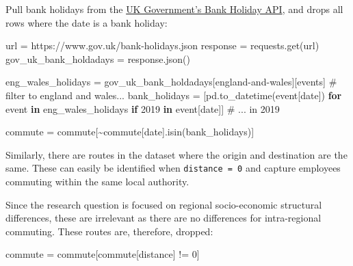 \documentclass[
  number]{elsarticle}
\newenvironment{Shaded}{\begin{snugshade}}{\end{snugshade}}
\newcommand{\CommentTok}[1]{\textcolor[rgb]{0.37,0.37,0.37}{#1}}
\newcommand{\ControlFlowTok}[1]{\textcolor[rgb]{0.00,0.23,0.31}{\textbf{#1}}}
\newcommand{\DecValTok}[1]{\textcolor[rgb]{0.68,0.00,0.00}{#1}}
\newcommand{\KeywordTok}[1]{\textcolor[rgb]{0.00,0.23,0.31}{\textbf{#1}}}
\newcommand{\NormalTok}[1]{\textcolor[rgb]{0.00,0.23,0.31}{#1}}
\newcommand{\OperatorTok}[1]{\textcolor[rgb]{0.37,0.37,0.37}{#1}}
\newcommand{\StringTok}[1]{\textcolor[rgb]{0.13,0.47,0.30}{#1}}
\begin{document}
Pull bank holidays from the
\href{https://www.gov.uk/bank-holidays.json}{UK Government's Bank
Holiday API}, and drops all rows where the date is a bank holiday:

\begin{Shaded}
\begin{Highlighting}[]
\NormalTok{url }\OperatorTok{=} \StringTok{\textquotesingle{}https://www.gov.uk/bank{-}holidays.json\textquotesingle{}}
\NormalTok{response }\OperatorTok{=}\NormalTok{ requests.get(url)}
\NormalTok{gov\_uk\_bank\_holdadays }\OperatorTok{=}\NormalTok{ response.json()}

\NormalTok{eng\_wales\_holidays }\OperatorTok{=}\NormalTok{ gov\_uk\_bank\_holdadays[}\StringTok{\textquotesingle{}england{-}and{-}wales\textquotesingle{}}\NormalTok{][}\StringTok{\textquotesingle{}events\textquotesingle{}}\NormalTok{] }\CommentTok{\# filter to england and wales...}
\NormalTok{bank\_holidays }\OperatorTok{=}\NormalTok{ [pd.to\_datetime(event[}\StringTok{\textquotesingle{}date\textquotesingle{}}\NormalTok{]) }\ControlFlowTok{for}\NormalTok{ event }\KeywordTok{in}\NormalTok{ eng\_wales\_holidays }\ControlFlowTok{if} \StringTok{\textquotesingle{}2019\textquotesingle{}} \KeywordTok{in}\NormalTok{ event[}\StringTok{\textquotesingle{}date\textquotesingle{}}\NormalTok{]] }\CommentTok{\# ... in 2019}

\NormalTok{commute }\OperatorTok{=}\NormalTok{ commute[}\OperatorTok{\textasciitilde{}}\NormalTok{commute[}\StringTok{\textquotesingle{}date\textquotesingle{}}\NormalTok{].isin(bank\_holidays)]}
\end{Highlighting}
\end{Shaded}

Similarly, there are routes in the dataset where the origin and
destination are the same. These can easily be identified when
\texttt{\textquotesingle{}distance\textquotesingle{}\ =\ 0} and capture
employees commuting within the same local authority.

Since the research question is focused on regional socio-economic
structural differences, these are irrelevant as there are no differences
for intra-regional commuting. These routes are, therefore, dropped:

\begin{Shaded}
\begin{Highlighting}[]
\NormalTok{commute }\OperatorTok{=}\NormalTok{ commute[commute[}\StringTok{\textquotesingle{}distance\textquotesingle{}}\NormalTok{] }\OperatorTok{!=} \DecValTok{0}\NormalTok{]}
\end{Highlighting}
\end{Shaded}
\end{document}
